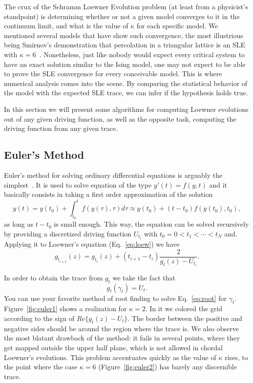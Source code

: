 The crux of the Schramm Loewner Evolution problem (at least from a physicist's
standpoint) is determining whether or not a given model converges to it in the
continuum limit, and what is the value of $\kappa$ for each specific model. We
mentioned several models that have show such convergence, the most illustrious
being Smirnov's demonstration that percolation in a triangular lattice is an
SLE with $\kappa=6$~\cite{Smirnov2001b}. Nonetheless, just like nobody would
expect every critical system to have an exact solution similar to the Ising
model, one may not expect to be able to prove the SLE convergence for every
conceivable model. This is where numerical analysis comes into the scene. By
comparing the statistical behavior of the model with the expected SLE trace, we
can infer if the hypothesis holds true.

In this section we will present some algorithms for computing Loewner
evolutions out of any given driving function, as well as the opposite task,
computing the driving function from any given trace.


\subsection{Euler's Method}
\label{ss:euler}

Euler's method for solving ordinary differential equations is arguably the
simplest~\cite{Press2007}. It is used to solve equation of the type $y'(t) =
f(y, t)$ and it basically consists in taking a first order approximation of the
solution
\begin{equation}
    \newcommand{\y}[1]{y\left(#1\right)}
    \newcommand{\f}[1]{f\left(#1\right)}
    \y{t} = \y{t_0} + \int_{t_0}^t \f{\y{\tau}, \tau} d\tau \approx
            \y{t_0} + \left(t - t_0\right)\f{\y{t_0}, t_0},
\end{equation}
as long as $t - t_0$ is small enough. This way, the equation can be solved
recursively by providing a discretized driving function $U_{t_i}$ with $t_0 =
0 < t_{1}<\cdots<t_N$ and. Applying it to Loewner's equation
(Eq.~\ref{eq:loew}) we have
\begin{equation}
    g_{t_{i+1}}(z) = g_{t_i}(z) + (t_{i+1} - t_i) \frac{2}{g_t(z) - U_{t_i}}.
\end{equation}

In order to obtain the trace from $g_t$ we take the fact that
\begin{equation}
    g_t(\gamma_t) = U_t.
    \label{eq:root}
\end{equation}
You can use your favorite method of root finding to solve Eq.~\ref{eq:root} for
$\gamma_t$. Figure~\ref{fig:euler1} shows a realization for $\kappa=2$. In it
we colored the grid according to the sign of $Re\{g_t(z)-U_t\}$. The border
between the positive and negative sides should be around the region where the
trace is. We also observe the most blatant drawback of the method: it fails in
several points, where they get mapped outside the upper half plane, which is
not allowed in chordal Loewner's evolutions. This problem accentuates quickly
as the value of $\kappa$ rises, to the point where the case $\kappa=6$
(Figure~\ref{fig:euler2}) has barely any discernible trace.

